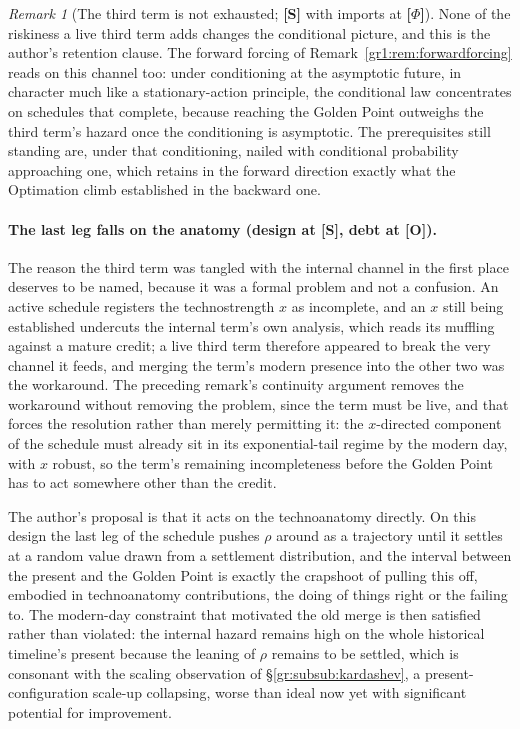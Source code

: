 \documentclass[11pt]{article}
\numberwithin{equation}{section}
\theoremstyle{plain}
\theoremstyle{definition}
\theoremstyle{remark}
\newtheorem{remark}[theorem]{Remark}
\begin{document}
\begin{remark}[The third term is not exhausted; \textbf{[S]} with imports at \textbf{[$\Phi$]}]
None of the riskiness a live third term adds changes the conditional
picture, and this is the author's retention clause. The forward
forcing of Remark~\ref{gr1:rem:forwardforcing} reads on this channel
too: under conditioning at the asymptotic future, in character much
like a stationary-action principle, the conditional law concentrates
on schedules that complete, because reaching the Golden Point
outweighs the third term's hazard once the conditioning is
asymptotic. The prerequisites still standing are, under that
conditioning, nailed with conditional probability approaching one,
which retains in the forward direction exactly what the Optimation
climb established in the backward one.
\end{remark}

\paragraph{The last leg falls on the anatomy (design at \textbf{[S]}, debt at \textbf{[O]}).}\label{sch:rem:anatomyleg}
The reason the third term was tangled with the internal channel in
the first place deserves to be named, because it was a formal
problem and not a confusion. An active schedule registers the
technostrength $x$ as incomplete, and an $x$ still being established
undercuts the internal term's own analysis, which reads its muffling
against a mature credit; a live third term therefore appeared to
break the very channel it feeds, and merging the term's modern
presence into the other two was the workaround. The preceding
remark's continuity argument removes the workaround without removing
the problem, since the term must be live, and that forces the
resolution rather than merely permitting it: the $x$-directed
component of the schedule must already sit in its exponential-tail
regime by the modern day, with $x$ robust, so the term's remaining
incompleteness before the Golden Point has to act somewhere other
than the credit.

The author's proposal is that it acts on the technoanatomy
directly. On this design the last leg of the schedule pushes $\rho$
around as a trajectory until it settles at a random value drawn from
a settlement distribution, and the interval between the present and
the Golden Point is exactly the crapshoot of pulling this off,
embodied in technoanatomy contributions, the doing of things right
or the failing to. The modern-day constraint that motivated the old
merge is then satisfied rather than violated: the internal hazard
remains high on the whole historical timeline's present because the
leaning of $\rho$ remains to be settled, which is consonant with the
scaling observation of \S\ref{gr:subsub:kardashev}, a
present-configuration scale-up collapsing, worse than ideal now yet
with significant potential for improvement.
\end{document}
